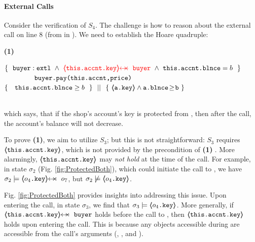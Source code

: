  
 \label{sec:howThird}
 
\paragraph{External Calls}  Consider  the  verification of $S_4$. 
The challenge is how to reason  about the external call on line 8 (from  in ). 
We need to establish the Hoare quadruple:

 \vspace{.05cm}
  \begin{minipage}{.05\textwidth}
   \textbf{(1)}\ \ 
\end{minipage}
\hfill
\begin{minipage}{.95\textwidth}
\begin{flushleft}
$\{\  \   \external{\prg{buyer}} \ \wedge\  {\color{red} {\protectedFrom {\prg{this.\myAccount.key}}  {\prg{buyer} } }}\ \wedge\ \prg{this.\myAccount.\balance}= b  \ \  \}$\\
$\ \ \ \ \ \ \ \ \ \ \ \ {\ \prg{buyer.pay(this.accnt,price)}   \ } $\\
$  \{\  \ \  {\prg{this.\myAccount.\balance}} \geq  b \  \  \} \ \ ||\ \  \{\ \inside{\prg{a.\password}}\wedge  \prg{a.\balance}\!\geq\!{\prg{b}}   \ \}  $ 
\end{flushleft}
\end{minipage}
\\
\noindent
which says, that  if the shop's account's key is protected from , then after the call, the account's balance will not decrease.

 \vspace{.1cm}
 
To prove \textbf{(1)}, we aim to utilize $S_3$; but this is not straightforward: %
 $S_3$   {\color{red} {requires $\langle\!\!\langle \mbox{\normalfont{\texttt{this.\mbox{\normalfont{\texttt{accnt}}}.key}}} \rangle\!\!\rangle$}}, which is not provided by the precondition of \textbf{(1)} .
 More alarmingly,  
$\langle\!\!\langle \mbox{\normalfont{\texttt{this.\mbox{\normalfont{\texttt{accnt}}}.key}}} \rangle\!\!\rangle$ may \emph{not hold} at the time of the call.
%
For example, in state $\sigma_2$ (Fig. \ref{fig:ProtectedBoth}), which could initiate the call to , we have $\sigma_2 \models \protectedFrom{o_4\prg{.key}} {o_7}$, but $\sigma_2 \not\models \langle\!\!\langle o_4\mbox{\normalfont{\texttt{.key}}} \rangle\!\!\rangle$.

Fig. \ref{fig:ProtectedBoth} provides insights into addressing this issue. Upon entering the call, in state $\sigma_3$, 
we find that $\sigma_3 \models \langle\!\!\langle o_4\mbox{\normalfont{\texttt{.key}}} \rangle\!\!\rangle$. More generally, if $\protectedFrom{\prg{this.\myAccount.key}}{\prg{buyer}}$ holds before the call to , then $\langle\!\!\langle \mbox{\normalfont{\texttt{this.\mbox{\normalfont{\texttt{accnt}}}.key}}} \rangle\!\!\rangle$ holds upon entering the call.
 This is because any objects   accessible during \prg{pay} are accessible from the call's arguments %
 (\ie \prg{buyer}, \prg{this.\myAccount}, and \prg{price}).

